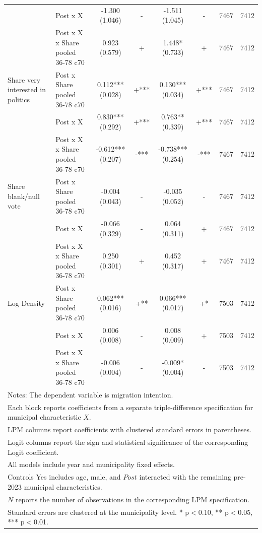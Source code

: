 \begin{table}[!htbp]
\begin{tabular}{llcccccc}
 & Post x X & -1.300 (1.046) & - & -1.511 (1.045) & - & 7467 & 7412 \\
 & Post x X x Share pooled 36-78 c70 & 0.923 (0.579) & + & 1.448* (0.733) & + & 7467 & 7412 \\
\hline
Share very interested in politics & Post x Share pooled 36-78 c70 & 0.112*** (0.028) & +*** & 0.130*** (0.034) & +*** & 7467 & 7412 \\
 & Post x X & 0.830*** (0.292) & +*** & 0.763** (0.339) & +*** & 7467 & 7412 \\
 & Post x X x Share pooled 36-78 c70 & -0.612*** (0.207) & -*** & -0.738*** (0.254) & -*** & 7467 & 7412 \\
\hline
Share blank/null vote & Post x Share pooled 36-78 c70 & -0.004 (0.043) & - & -0.035 (0.052) & - & 7467 & 7412 \\
 & Post x X & -0.066 (0.329) & - & 0.064 (0.311) & + & 7467 & 7412 \\
 & Post x X x Share pooled 36-78 c70 & 0.250 (0.301) & + & 0.452 (0.317) & + & 7467 & 7412 \\
\hline
Log Density & Post x Share pooled 36-78 c70 & 0.062*** (0.016) & +** & 0.066*** (0.017) & +* & 7503 & 7412 \\
 & Post x X & 0.006 (0.008) & - & 0.008 (0.009) & + & 7503 & 7412 \\
 & Post x X x Share pooled 36-78 c70 & -0.006 (0.004) & - & -0.009* (0.004) & - & 7503 & 7412 \\
\hline
\multicolumn{8}{l}{\footnotesize Notes: The dependent variable is migration intention.} \\
\multicolumn{8}{l}{\footnotesize Each block reports coefficients from a separate triple-difference specification for municipal characteristic $X$.} \\
\multicolumn{8}{l}{\footnotesize LPM columns report coefficients with clustered standard errors in parentheses.} \\
\multicolumn{8}{l}{\footnotesize Logit columns report the sign and statistical significance of the corresponding Logit coefficient.} \\
\multicolumn{8}{l}{\footnotesize All models include year and municipality fixed effects.} \\
\multicolumn{8}{l}{\footnotesize Controls Yes includes age, male, and $Post$ interacted with the remaining pre-2023 municipal characteristics.} \\
\multicolumn{8}{l}{\footnotesize $N$ reports the number of observations in the corresponding LPM specification.} \\
\multicolumn{8}{l}{\footnotesize Standard errors are clustered at the municipality level. * p$<$0.10, ** p$<$0.05, *** p$<$0.01.} \\
\end{tabular}
\end{table}
